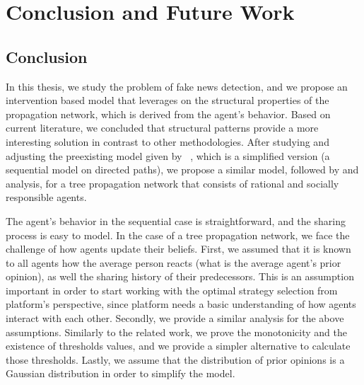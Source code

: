 
\chapter{Conclusion and Future Work}
\label{ch:ConclusionsFwork}


\section{Conclusion }
\label{sec:Concl}
In this thesis, we study the problem of fake news detection, and we propose an intervention based model that leverages on the structural properties of the propagation network, which is derived from the agent's behavior. Based on current literature, we concluded that structural patterns provide a more interesting solution in contrast to other methodologies. After studying and adjusting the preexisting model given by ~\cite{papanastasiou}, which is a simplified version (a sequential model on directed paths), we propose a similar model, followed by and analysis, for a tree propagation network that consists of rational and socially responsible agents.

The agent's behavior in the sequential case is straightforward, and the sharing process is easy to model. In the case of a tree propagation network, we face the challenge of how agents update their beliefs. First, we assumed that it is known to all agents how the average person reacts (what is the average agent's prior opinion), as well the sharing history of their predecessors. This is an assumption important in order to start working with the optimal strategy selection from platform's perspective, since platform needs a basic understanding of how agents interact with each other. Secondly, we provide a similar analysis for the above assumptions. Similarly to the related work, we prove the monotonicity and the existence of thresholds values, and we provide a simpler alternative to calculate those thresholds. Lastly, we assume that the distribution of prior opinions is a Gaussian distribution in order to simplify the model.

